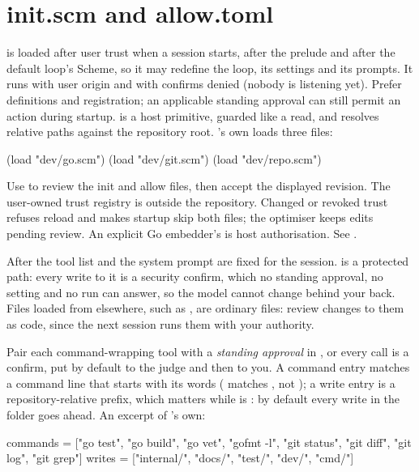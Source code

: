 \section{init.scm and allow.toml}\label{sch:init}

 is loaded after user trust when a session starts, after the
prelude and after the default loop's Scheme, so it may redefine the loop,
its settings and its prompts. It runs with user origin and with confirms
denied (nobody is listening yet). Prefer definitions and registration; an
applicable standing approval can still permit an action during startup.  is a host primitive, guarded like a read, and resolves
relative paths against the repository root. \nodwyn's own 
loads three files:

\begin{scm}
(load "dev/go.scm")
(load "dev/git.scm")
(load "dev/repo.scm")
\end{scm}

Use  to review the init and allow files, then
accept the displayed revision. The user-owned trust registry is outside the
repository. Changed or revoked trust refuses reload and makes startup skip both
files; the optimiser keeps edits pending review. An explicit Go embedder's
 is host authorisation. See .

After  the tool list and the system prompt are fixed for the
session.  is a protected path: every write to it is a
security confirm, which no standing approval, no \code{[approval]} setting
and no  run can answer, so the model cannot change
 behind your back. Files
loaded from elsewhere, such as , are ordinary files: review
changes to them as code, since the next session runs them with your
authority.

Pair each command-wrapping tool with a \emph{standing approval} in
, or every call is a confirm, put by default to
the judge and then to you. A command entry matches a command line that
starts with its words ( matches
, not ); a write entry is a
repository-relative prefix, which matters while  is
: by default every write in the folder goes ahead. An excerpt
of \nodwyn's own:

\begin{txt}
commands = ["go test", "go build", "go vet", "gofmt -l",
            "git status", "git diff", "git log", "git grep"]
writes   = ["internal/", "docs/", "test/", "dev/", "cmd/"]
\end{txt}

